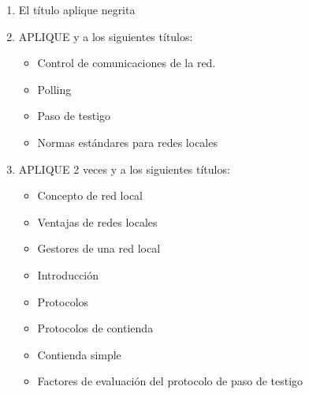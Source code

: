 \documentclass[letterpaper,10pt,spanish]{sphinxmanual}
\begin{document}
\begin{enumerate}
\begin{sphinxadmonition}{note}{En su cuaderno…}
\begin{itemize}
\end{itemize}
\end{sphinxadmonition}

\item {} 
\sphinxAtStartPar
El título  aplique  negrita

\item {} 
\sphinxAtStartPar
APLIQUE  y  a los siguientes títulos:
\begin{itemize}
\item {} 
\sphinxAtStartPar
Control de comunicaciones de la red.

\item {} 
\sphinxAtStartPar
Polling

\item {} 
\sphinxAtStartPar
Paso de testigo

\item {} 
\sphinxAtStartPar
Normas estándares para redes locales

\end{itemize}

\item {} 
\sphinxAtStartPar
APLIQUE 2 veces  y  a los siguientes títulos:
\begin{itemize}
\item {} 
\sphinxAtStartPar
Concepto de red local

\item {} 
\sphinxAtStartPar
Ventajas de redes locales

\item {} 
\sphinxAtStartPar
Gestores de una red local

\item {} 
\sphinxAtStartPar
Introducción

\item {} 
\sphinxAtStartPar
Protocolos

\item {} 
\sphinxAtStartPar
Protocolos de contienda

\item {} 
\sphinxAtStartPar
Contienda simple

\item {} 
\sphinxAtStartPar
Factores de evaluación del protocolo de paso de testigo

\end{itemize}


\end{enumerate}
\end{document}
